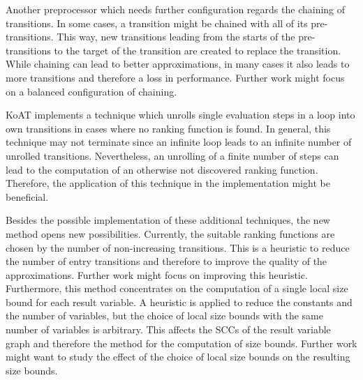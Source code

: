 Another preprocessor which needs further configuration regards the chaining of transitions.
In some cases, a transition might be chained with all of its pre-transitions.
This way, new transitions leading from the starts of the pre-transitions to the target of the transition are created to replace the transition.
While chaining can lead to better approximations, in many cases it also leads to more transitions and therefore a loss in performance.
Further work might focus on a balanced configuration of chaining.

KoAT \cite{koat} implements a technique which unrolls single evaluation steps in a loop into own transitions in cases where no ranking function is found.
In general, this technique may not terminate since an infinite loop leads to an infinite number of unrolled transitions.
Nevertheless, an unrolling of a finite number of steps can lead to the computation of an otherwise not discovered ranking function.
Therefore, the application of this technique in the implementation might be beneficial.

Besides the possible implementation of these additional techniques, the new method opens new possibilities.
Currently, the suitable ranking functions are chosen by the number of non-increasing transitions.
This is a heuristic to reduce the number of entry transitions and therefore to improve the quality of the approximations.
Further work might focus on improving this heuristic.
Furthermore, this method concentrates on the computation of a single local size bound for each result variable.
A heuristic is applied to reduce the constants and the number of variables, but the choice of local size bounds with the same number of variables is arbitrary.
This affects the SCCs of the result variable graph and therefore the method for the computation of size bounds.
Further work might want to study the effect of the choice of local size bounds on the resulting size bounds.

